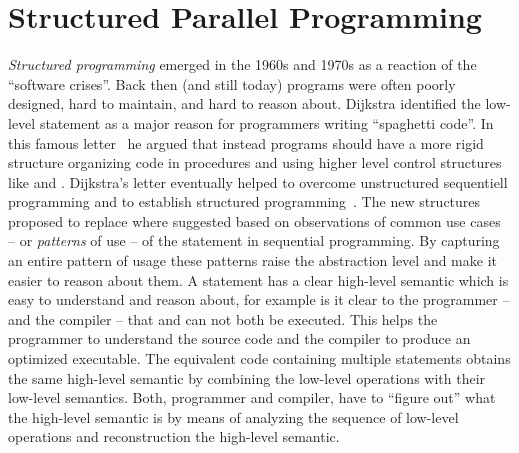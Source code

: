 \section{Structured Parallel Programming}
\emph{Structured programming} emerged in the 1960s and 1970s as a reaction of the ``software crises''.
Back then (and still today) programs were often poorly designed, hard to maintain, and hard to reason about.
Dijkstra identified the low-level  statement as a major reason for programmers writing ``spaghetti code''.
In this famous letter~\cite{Dijkstra68a} he argued that instead programs should have a more rigid structure organizing code in procedures and using higher level control structures like  and .
Dijkstra's letter eventually helped to overcome unstructured sequentiell programming and to establish structured programming~\cite{DahlDiHo1972}.
The new structures proposed to replace  where suggested based on observations of common use cases -- or \emph{patterns} of use -- of the  statement in sequential programming.
By capturing an entire pattern of usage these patterns raise the abstraction level and make it easier to reason about them.
A  statement has a clear high-level semantic which is easy to understand and reason about, for example is it clear to the programmer -- and the compiler -- that  and  can not both be executed.
This helps the programmer to understand the source code and the compiler to produce an optimized executable.
The equivalent code containing multiple  statements obtains the same high-level semantic by combining the low-level operations with their low-level semantics.
Both, programmer and compiler, have to ``figure out'' what the high-level semantic is by means of analyzing the sequence of low-level operations and reconstruction the high-level semantic.

